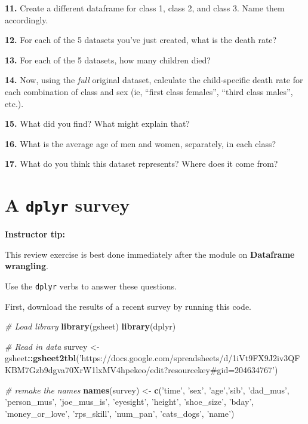 \documentclass[
]{book}
\newenvironment{Shaded}{\begin{snugshade}}{\end{snugshade}}
\newcommand{\CommentTok}[1]{\textcolor[rgb]{0.56,0.35,0.01}{\textit{#1}}}
\newcommand{\KeywordTok}[1]{\textcolor[rgb]{0.13,0.29,0.53}{\textbf{#1}}}
\newcommand{\NormalTok}[1]{#1}
\newcommand{\OperatorTok}[1]{\textcolor[rgb]{0.81,0.36,0.00}{\textbf{#1}}}
\newcommand{\StringTok}[1]{\textcolor[rgb]{0.31,0.60,0.02}{#1}}
\begin{document}
\textbf{11.} Create a different dataframe for class 1, class 2, and class 3. Name them accordingly.

\textbf{12.} For each of the 5 datasets you've just created, what is the death rate?

\textbf{13.} For each of the 5 datasets, how many children died?

\textbf{14.} Now, using the \emph{full} original dataset, calculate the child-specific death rate for each combination of class and sex (ie, ``first class females'', ``third class males'', etc.).

\textbf{15.} What did you find? What might explain that?

\textbf{16.} What is the average age of men and women, separately, in each class?

\textbf{17.} What do you think this dataset represents? Where does it come from?

\hypertarget{a-dplyr-survey}{%
\chapter{\texorpdfstring{A \texttt{dplyr} survey}{A dplyr survey}}\label{a-dplyr-survey}}

\leavevmode\hypertarget{tip-text}{}%
\textbf{Instructor tip:}

This review exercise is best done immediately after the module on \textbf{Dataframe wrangling}.

Use the \texttt{dplyr} verbs to answer these questions.

First, download the results of a recent survey by running this code.

\begin{Shaded}
\begin{Highlighting}[]
\CommentTok{# Load library}
\KeywordTok{library}\NormalTok{(gsheet)}
\KeywordTok{library}\NormalTok{(dplyr)}

\CommentTok{# Read in data}
\NormalTok{survey  <-}\StringTok{ }\NormalTok{gsheet}\OperatorTok{::}\KeywordTok{gsheet2tbl}\NormalTok{(}\StringTok{'https://docs.google.com/spreadsheets/d/1iVt9FX9J2iv3QFKBM7Gzb9dgva70XrW1lxMV4hpekeo/edit?resourcekey#gid=204634767'}\NormalTok{)}

\CommentTok{# remake the names}
\KeywordTok{names}\NormalTok{(survey) <-}\StringTok{ }\KeywordTok{c}\NormalTok{(}\StringTok{'time'}\NormalTok{, }\StringTok{'sex'}\NormalTok{, }\StringTok{'age'}\NormalTok{,}\StringTok{'sib'}\NormalTok{, }\StringTok{'dad_mus'}\NormalTok{, }\StringTok{'person_mus'}\NormalTok{, }\StringTok{'joe_mus_is'}\NormalTok{, }\StringTok{'eyesight'}\NormalTok{, }\StringTok{'height'}\NormalTok{, }\StringTok{'shoe_size'}\NormalTok{, }\StringTok{'bday'}\NormalTok{, }\StringTok{'money_or_love'}\NormalTok{, }\StringTok{'rps_skill'}\NormalTok{, }\StringTok{'num_pan'}\NormalTok{, }\StringTok{'cats_dogs'}\NormalTok{, }\StringTok{'name'}\NormalTok{)}
\end{Highlighting}
\end{Shaded}
\end{document}
